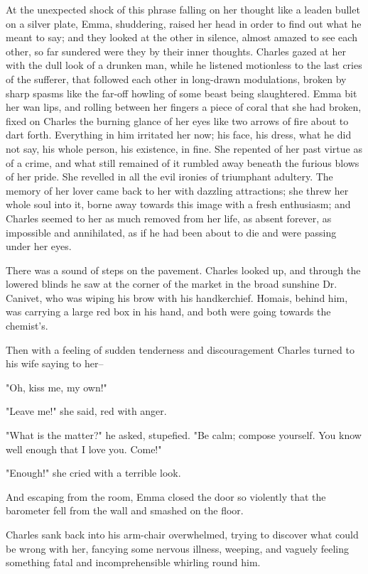 \documentclass[11pt,twocolumn]{ltugboat}
\begin{document}
At the unexpected shock of this phrase falling on her thought like a
leaden bullet on a silver plate, Emma, shuddering, raised her head in
order to find out what he meant to say; and they looked at the other in
silence, almost amazed to see each other, so far sundered were they
by their inner thoughts. Charles gazed at her with the dull look of
a drunken man, while he listened motionless to the last cries of the
sufferer, that followed each other in long-drawn modulations, broken by
sharp spasms like the far-off howling of some beast being slaughtered.
Emma bit her wan lips, and rolling between her fingers a piece of coral
that she had broken, fixed on Charles the burning glance of her eyes
like two arrows of fire about to dart forth. Everything in him irritated
her now; his face, his dress, what he did not say, his whole person, his
existence, in fine. She repented of her past virtue as of a crime, and
what still remained of it rumbled away beneath the furious blows of her
pride. She revelled in all the evil ironies of triumphant adultery.
The memory of her lover came back to her with dazzling attractions; she
threw her whole soul into it, borne away towards this image with a fresh
enthusiasm; and Charles seemed to her as much removed from her life, as
absent forever, as impossible and annihilated, as if he had been about
to die and were passing under her eyes.

There was a sound of steps on the pavement. Charles looked up, and
through the lowered blinds he saw at the corner of the market in
the broad sunshine Dr. Canivet, who was wiping his brow with his
handkerchief. Homais, behind him, was carrying a large red box in his
hand, and both were going towards the chemist's.

Then with a feeling of sudden tenderness and discouragement Charles
turned to his wife saying to her--

"Oh, kiss me, my own!"

"Leave me!" she said, red with anger.

"What is the matter?" he asked, stupefied. "Be calm; compose yourself.
You know well enough that I love you. Come!"

"Enough!" she cried with a terrible look.

And escaping from the room, Emma closed the door so violently that the
barometer fell from the wall and smashed on the floor.

Charles sank back into his arm-chair overwhelmed, trying to discover
what could be wrong with her, fancying some nervous illness, weeping,
and vaguely feeling something fatal and incomprehensible whirling round
him.
\end{document}
